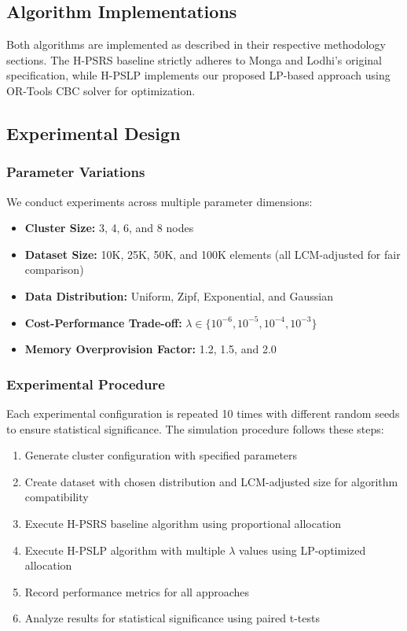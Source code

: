 \documentclass[]{interact}
\theoremstyle{plain}
\theoremstyle{definition}
\theoremstyle{remark}
\begin{document}
\subsection{Algorithm Implementations}

Both algorithms are implemented as described in their respective methodology sections. The H-PSRS baseline strictly adheres to Monga and Lodhi's original specification, while H-PSLP implements our proposed LP-based approach using OR-Tools CBC solver for optimization.

\subsection{Experimental Design}

\subsubsection{Parameter Variations}

We conduct experiments across multiple parameter dimensions:

\begin{itemize}
\item \textbf{Cluster Size:} 3, 4, 6, and 8 nodes
\item \textbf{Dataset Size:} 10K, 25K, 50K, and 100K elements (all LCM-adjusted for fair comparison)
\item \textbf{Data Distribution:} Uniform, Zipf, Exponential, and Gaussian
\item \textbf{Cost-Performance Trade-off:} $\lambda \in \{10^{-6}, 10^{-5}, 10^{-4}, 10^{-3}\}$
\item \textbf{Memory Overprovision Factor:} 1.2, 1.5, and 2.0
\end{itemize}

\subsubsection{Experimental Procedure}

Each experimental configuration is repeated 10 times with different random seeds to ensure statistical significance. The simulation procedure follows these steps:

\begin{enumerate}
\item Generate cluster configuration with specified parameters
\item Create dataset with chosen distribution and LCM-adjusted size for algorithm compatibility
\item Execute H-PSRS baseline algorithm using proportional allocation
\item Execute H-PSLP algorithm with multiple $\lambda$ values using LP-optimized allocation
\item Record performance metrics for all approaches
\item Analyze results for statistical significance using paired t-tests
\end{enumerate}
\end{document}
